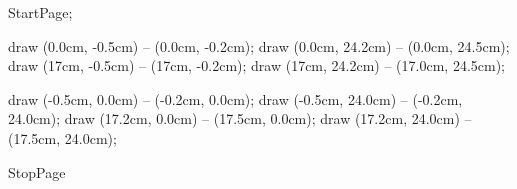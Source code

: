     StartPage;

        draw (0.0cm, -0.5cm) -- (0.0cm, -0.2cm);
        draw (0.0cm, 24.2cm) -- (0.0cm, 24.5cm);
        draw (17cm, -0.5cm) -- (17cm, -0.2cm);
        draw (17cm, 24.2cm) -- (17.0cm, 24.5cm);

        draw (-0.5cm, 0.0cm) -- (-0.2cm, 0.0cm);
        draw (-0.5cm, 24.0cm) -- (-0.2cm, 24.0cm);
        draw (17.2cm, 0.0cm) -- (17.5cm, 0.0cm);
        draw (17.2cm, 24.0cm) -- (17.5cm, 24.0cm);


    StopPage
\stopreusableMPgraphic

